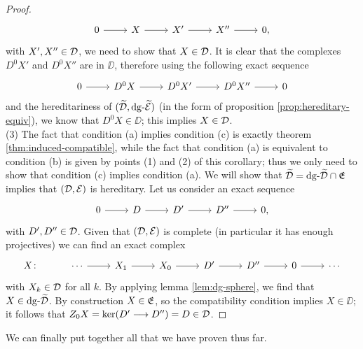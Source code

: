 \begin{proof}
\[\begin{tikzcd}
        0 & X & {X'} & {X''} & {0,}
        \arrow[from=1-1, to=1-2]
        \arrow[from=1-2, to=1-3]
        \arrow[from=1-3, to=1-4]
        \arrow[from=1-4, to=1-5]
    \end{tikzcd}\]
    with $X',X'' \in \mathcal{D}$, we need to show that $X \in \mathcal{D}$. It is clear that the complexes $D^0 X'$ and $D^0 X''$ are in $\DD$, therefore using the following exact sequence
    \[\begin{tikzcd}
        0 & {D^0X} & {D^0X'} & {D^0X''} & 0
        \arrow[from=1-1, to=1-2]
        \arrow[from=1-2, to=1-3]
        \arrow[from=1-3, to=1-4]
        \arrow[from=1-4, to=1-5]
    \end{tikzcd}\]
    and the hereditariness of $(\widetilde{\mathcal{D}}, \mathrm{dg} \text{-}\widetilde{\mathcal{E}})$ (in the form of proposition \ref{prop:hereditary-equiv}), we know that $D^0X \in \DD$; this implies $X \in \mathcal{D}$. \\
    (3) The fact that condition (a) implies condition (c) is exactly theorem \ref{thm:induced-compatible}, while the fact that condition (a) is equivalent to condition (b) is given by points (1) and (2) of this corollary; thus we only need to show that condition (c) implies condition (a). We will show that $\widetilde{\mathcal{D}} = \mathrm{dg} \text{-}\widetilde{\mathcal{D}} \cap \mathfrak{E}$ implies that $(\mathcal{D}, \mathcal{E})$ is hereditary. Let us consider an exact sequence
    \[\begin{tikzcd}
        0 & D & {D'} & {D''} & {0,}
        \arrow[from=1-1, to=1-2]
        \arrow[from=1-2, to=1-3]
        \arrow[from=1-3, to=1-4]
        \arrow[from=1-4, to=1-5]
    \end{tikzcd}\]
    with $D',D'' \in \mathcal{D}$. Given that $(\mathcal{D}, \mathcal{E})$ is complete (in particular it has enough projectives) we can find an exact complex
    \[\begin{tikzcd}
        {X\colon} & \cdots & {X_1} & {X_0} & {D'} & {D''} & 0 & \cdots
        \arrow[from=1-2, to=1-3]
        \arrow[from=1-3, to=1-4]
        \arrow[from=1-4, to=1-5]
        \arrow[from=1-5, to=1-6]
        \arrow[from=1-6, to=1-7]
        \arrow[from=1-7, to=1-8]
    \end{tikzcd}\]
    with $X_k \in \mathcal{D}$ for all $k$. By applying lemma \ref{lem:dg-sphere}, we find that $X \in \mathrm{dg} \text{-}\widetilde{\mathcal{D}}$. By construction $X \in \mathfrak{E}$, so the compatibility condition implies $X \in \DD$; it follows that $Z_0X =\ker(D' \longrightarrow D'') = D \in \mathcal{D}$.
\end{proof}

We can finally put together all that we have proven thus far.

